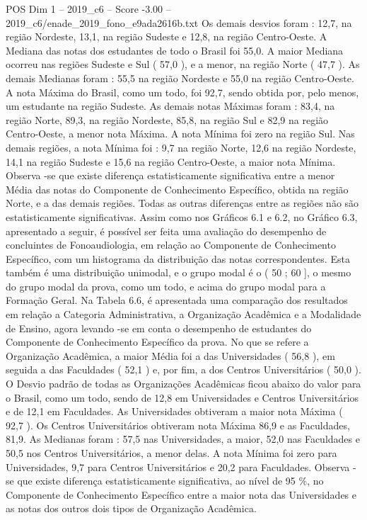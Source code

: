 \begin{textsample}{POS Dim 1 – 2019\_c6 – Score -3.00 – 2019\_c6/enade\_2019\_fono\_e9ada2616b.txt}
Os demais desvios foram : 12,7, na região Nordeste, 13,1, na região Sudeste e 12,8, na região Centro-Oeste.
A Mediana das notas dos estudantes de todo o Brasil foi 55,0.
A maior Mediana ocorreu nas regiões Sudeste e Sul ( 57,0 ), e a menor, na região Norte ( 47,7 ).
As demais Medianas foram : 55,5 na região Nordeste e 55,0 na região Centro-Oeste.
A nota Máxima do Brasil, como um todo, foi 92,7, sendo obtida por, pelo menos, um estudante na região Sudeste.
As demais notas Máximas foram : 83,4, na região Norte, 89,3, na região Nordeste, 85,8, na região Sul e 82,9 na região Centro-Oeste, a menor nota Máxima.
A nota Mínima foi zero na região Sul.
Nas demais regiões, a nota Mínima foi : 9,7 na região Norte, 12,6 na região Nordeste, 14,1 na região Sudeste e 15,6 na região Centro-Oeste, a maior nota Mínima.
Observa -se que existe diferença estatisticamente significativa entre a menor Média das notas do Componente de Conhecimento Específico, obtida na região Norte, e a das demais regiões.
Todas as outras diferenças entre as regiões não são estatisticamente significativas.
Assim como nos Gráficos 6.1 e 6.2, no Gráfico 6.3, apresentado a seguir, é possível ser feita uma avaliação do desempenho de concluintes de Fonoaudiologia, em relação ao Componente de Conhecimento Específico, com um histograma da distribuição das notas correspondentes.
Esta também é uma distribuição unimodal, e o grupo modal é o ( 50 ; 60 ], o mesmo do grupo modal da prova, como um todo, e acima do grupo modal para a Formação Geral.
Na Tabela 6.6, é apresentada uma comparação dos resultados em relação a Categoria Administrativa, a Organização Acadêmica e a Modalidade de Ensino, agora levando -se em conta o desempenho de estudantes do Componente de Conhecimento Específico da prova.
No que se refere a Organização Acadêmica, a maior Média foi a das Universidades ( 56,8 ), em seguida a das Faculdades ( 52,1 ) e, por fim, a dos Centros Universitários ( 50,0 ).
O Desvio padrão de todas as Organizações Acadêmicas ficou abaixo do valor para o Brasil, como um todo, sendo de 12,8 em Universidades e Centros Universitários e de 12,1 em Faculdades.
As Universidades obtiveram a maior nota Máxima ( 92,7 ).
Os Centros Universitários obtiveram nota Máxima 86,9 e as Faculdades, 81,9.
As Medianas foram : 57,5 nas Universidades, a maior, 52,0 nas Faculdades e 50,5 nos Centros Universitários, a menor delas.
A nota Mínima foi zero para Universidades, 9,7 para Centros Universitários e 20,2 para Faculdades.
Observa -se que existe diferença estatisticamente significativa, ao nível de 95 \%, no Componente de Conhecimento Específico entre a maior nota das Universidades e as notas dos outros dois tipos de Organização Acadêmica.

\end{textsample}
